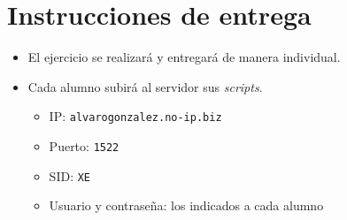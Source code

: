 \section{Instrucciones de entrega}
\begin{itemize}
\item El ejercicio se realizará y entregará de manera individual.
\item Cada alumno subirá al servidor sus \textit{scripts}.
  \begin{itemize}
  \item IP: \texttt{alvarogonzalez.no-ip.biz}
  \item Puerto: \texttt{1522}
  \item SID: \texttt{XE}
  \item Usuario y contraseña: los indicados a cada alumno
  \end{itemize}
\end{itemize}



